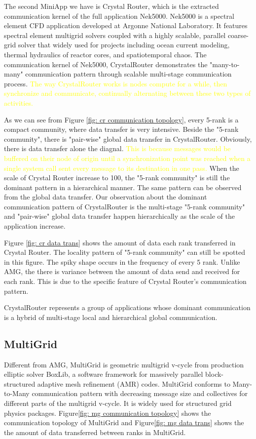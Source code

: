 \documentclass[conference]{IEEEtran}
\begin{document}
The second MiniApp we have is Crystal Router, which is the extracted communication kernel of the full application Nek5000. Nek5000\cite{crystalrouter} is a spectral element CFD application developed at Argonne National Laboratory. It features spectral element multigrid solvers coupled with a highly scalable, parallel coarse-grid solver that widely used for projects including ocean current modeling, thermal hydraulics of reactor cores, and spatiotemporal chaos. The communication kernel of Nek5000, CrystalRouter demonstrates the "many-to-many" communication pattern through scalable multi-stage communication process. \textcolor{yellow}{The way CrystalRouter works is nodes compute for a while, then synchronize and communicate, continually alternating between these two types of activities.}

As we can see from Figure \ref{fig: cr communication topology}, every 5-rank is a compact community, where data transfer is very intensive. Beside the "5-rank community", there is "pair-wise" global data transfer in CrystalRouter. Obviously, there is data transfer alone the diagnal. \textcolor{yellow}{This is because messages would be buffered on their node of origin until a synchronization point was reached when a single system call sent every message to its destination in one pass.} When the scale of Crystal Router increase to 100, the "5-rank community" is still the dominant pattern in a hierarchical manner. The same pattern can be observed from the global data transfer. Our observation about the dominant communication pattern of CrystalRouter is the multi-stage "5-rank community" and "pair-wise" global data transfer happen hierarchically as the scale of the application increase.

Figure \ref{fig: cr data trans} shows the amount of data each rank transferred in Crystal Router. The locality pattern of "5-rank community" can still be spotted in this figure. The spiky shape occurs in the frequency of every 5 rank. Unlike AMG, the there is variance between the amount of data send and received for each rank. This is due to the specific feature of Crystal Router's communication pattern.

CrystalRouter represents a group of applications whose dominant communication is a hybrid of multi-stage local and hierarchical global communication.



\subsection{MultiGrid}
\label{sec:multigrid}
Different from AMG, MultiGrid is geometric multigrid v-cycle from production elliptic solver BoxLib, a software framework for massively parallel block-structured adaptive mesh refinement (AMR) codes. MultiGrid conforms to Many-to-Many communication pattern with decreasing message size and collectives for different parts of the multigrid v-cycle. It is widely used for structured grid physics packages. Figure\ref{fig: mg communication topology} shows the communication topology of MultiGrid and Figure\ref{fig: mg data trans} shows the the amount of data transferred between ranks in MultiGrid.
\end{document}
